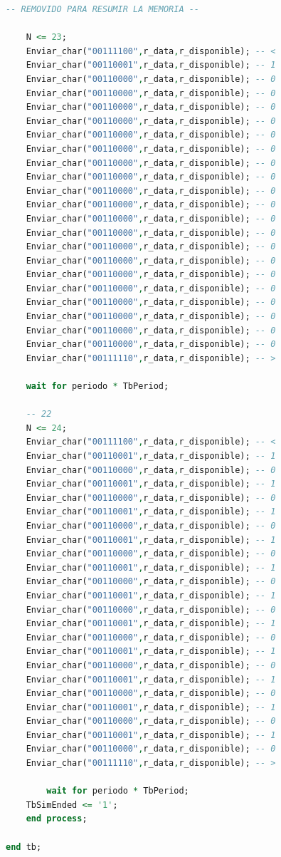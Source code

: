 \begin{lstlisting}[language = vhdl,caption=Testbench del módulo enclavamiento,label={lst:test_separador}]
	-- REMOVIDO PARA RESUMIR LA MEMORIA --
	
	N <= 23; 	
	Enviar_char("00111100",r_data,r_disponible); -- < 	
	Enviar_char("00110001",r_data,r_disponible); -- 1 	
	Enviar_char("00110000",r_data,r_disponible); -- 0
 	Enviar_char("00110000",r_data,r_disponible); -- 0 	
	Enviar_char("00110000",r_data,r_disponible); -- 0
	Enviar_char("00110000",r_data,r_disponible); -- 0 	
	Enviar_char("00110000",r_data,r_disponible); -- 0
	Enviar_char("00110000",r_data,r_disponible); -- 0 	
	Enviar_char("00110000",r_data,r_disponible); -- 0
	Enviar_char("00110000",r_data,r_disponible); -- 0 	
	Enviar_char("00110000",r_data,r_disponible); -- 0
	Enviar_char("00110000",r_data,r_disponible); -- 0 	
	Enviar_char("00110000",r_data,r_disponible); -- 0
	Enviar_char("00110000",r_data,r_disponible); -- 0 	
	Enviar_char("00110000",r_data,r_disponible); -- 0
	Enviar_char("00110000",r_data,r_disponible); -- 0 	
	Enviar_char("00110000",r_data,r_disponible); -- 0
	Enviar_char("00110000",r_data,r_disponible); -- 0 	
	Enviar_char("00110000",r_data,r_disponible); -- 0
	Enviar_char("00110000",r_data,r_disponible); -- 0 	
	Enviar_char("00110000",r_data,r_disponible); -- 0
	Enviar_char("00110000",r_data,r_disponible); -- 0 	
	Enviar_char("00111110",r_data,r_disponible); -- >

	wait for periodo * TbPeriod;

	-- 22
	N <= 24; 	
	Enviar_char("00111100",r_data,r_disponible); -- < 	
	Enviar_char("00110001",r_data,r_disponible); -- 1 	
	Enviar_char("00110000",r_data,r_disponible); -- 0
 	Enviar_char("00110001",r_data,r_disponible); -- 1 	
	Enviar_char("00110000",r_data,r_disponible); -- 0
	Enviar_char("00110001",r_data,r_disponible); -- 1 	
	Enviar_char("00110000",r_data,r_disponible); -- 0
	Enviar_char("00110001",r_data,r_disponible); -- 1 	
	Enviar_char("00110000",r_data,r_disponible); -- 0
	Enviar_char("00110001",r_data,r_disponible); -- 1 	
	Enviar_char("00110000",r_data,r_disponible); -- 0
	Enviar_char("00110001",r_data,r_disponible); -- 1 	
	Enviar_char("00110000",r_data,r_disponible); -- 0
	Enviar_char("00110001",r_data,r_disponible); -- 1 	
	Enviar_char("00110000",r_data,r_disponible); -- 0
	Enviar_char("00110001",r_data,r_disponible); -- 1 	
	Enviar_char("00110000",r_data,r_disponible); -- 0
	Enviar_char("00110001",r_data,r_disponible); -- 1 	
	Enviar_char("00110000",r_data,r_disponible); -- 0
	Enviar_char("00110001",r_data,r_disponible); -- 1 	
	Enviar_char("00110000",r_data,r_disponible); -- 0
	Enviar_char("00110001",r_data,r_disponible); -- 1 
	Enviar_char("00110000",r_data,r_disponible); -- 0	
	Enviar_char("00111110",r_data,r_disponible); -- >
	
        wait for periodo * TbPeriod;
	TbSimEnded <= '1';
    end process;
	
end tb;
		\end{lstlisting}
			
